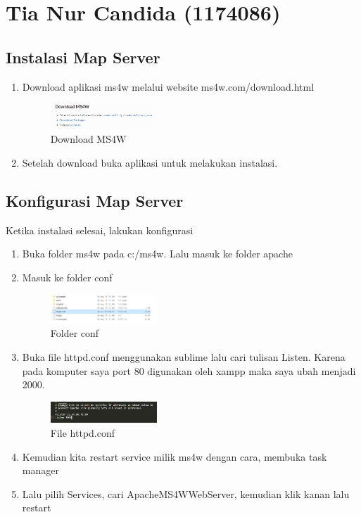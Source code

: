 \section{Tia Nur Candida (1174086)}
\subsection{Instalasi Map Server}
\begin{enumerate}
	\item Download aplikasi ms4w melalui website ms4w.com/download.html
	\hfill\break
	\begin{figure}[H]
		\includegraphics[width=4cm]{figures/tugas4/1174086/download.png}
		\centering
		\caption{Download MS4W}
	\end{figure}
	\hfill\break
	
	\item Setelah download buka aplikasi untuk melakukan instalasi.
\end{enumerate}

\subsection{Konfigurasi Map Server}
Ketika instalasi selesai, lakukan konfigurasi
\begin{enumerate}
	\item Buka folder ms4w pada c:/ms4w. Lalu masuk ke folder apache
	\hfill\break
	
	
	\item Masuk ke folder conf
	\hfill\break
	\begin{figure}[H]
		\includegraphics[width=4cm]{figures/tugas4/1174086/conf.png}
		\centering
		\caption{Folder conf}
	\end{figure}
	
	\item Buka file httpd.conf menggunakan sublime lalu cari tulisan Listen. Karena pada komputer saya port 80 digunakan oleh xampp maka saya ubah menjadi 2000.
	\hfill\break
	\begin{figure}[H]
		\includegraphics[width=4cm]{figures/tugas4/1174086/2000.png}
		\centering
		\caption{File httpd.conf}
	\end{figure}
	
	\item Kemudian kita restart service milik ms4w dengan cara, membuka task manager
	\hfill\break
	
	\item Lalu pilih Services, cari ApacheMS4WWebServer, kemudian klik kanan lalu restart
	\hfill\break
	
\end{enumerate}


